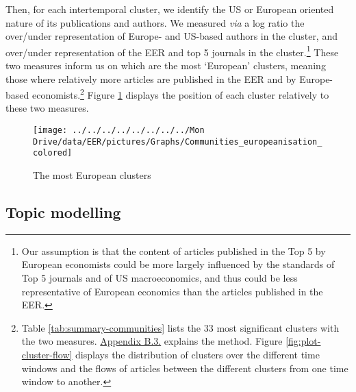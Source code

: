 \documentclass[
  12pt,
  onecolumn]{article}
\begin{document}
Then, for each intertemporal cluster, we identify the US or European
oriented nature of its publications and authors. We measured \emph{via}
a log ratio the over/under representation of Europe- and US-based
authors in the cluster, and over/under representation of the EER and top
5 journals in the cluster.\footnote{Our assumption is that the content
  of articles published in the Top 5 by European economists could be
  more largely influenced by the standards of Top 5 journals and of US
  macroeconomics, and thus could be less representative of European
  economics than the articles published in the EER.} These two measures
inform us on which are the most `European' clusters, meaning those where
relatively more articles are published in the EER and by Europe-based
economists.\footnote{Table \ref{tab:summary-communities} lists the 33
  most significant clusters with the two measures.
  \protect\hyperlink{network}{Appendix B.3.} explains the method. Figure
  \ref{fig:plot-cluster-flow} displays the distribution of clusters over
  the different time windows and the flows of articles between the
  different clusters from one time window to another.} Figure
\ref{fig:plot-community-diff} displays the position of each cluster
relatively to these two measures.

\begin{figure}[h]

{\centering \texttt{[image: ../../../../../../../../Mon Drive/data/EER/pictures/Graphs/Communities\_europeanisation\_colored]} 

}

\caption{The most European clusters}\label{fig:plot-community-diff}
\end{figure}

\hypertarget{topic-modelling}{%
\subsection{Topic modelling}\label{topic-modelling}}
\end{document}
